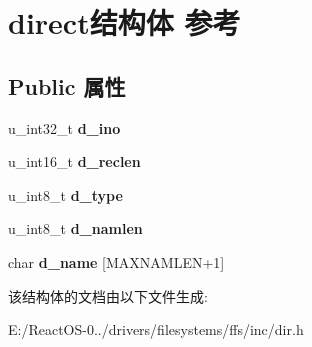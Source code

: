 \hypertarget{structdirect}{}\section{direct结构体 参考}
\label{structdirect}
\subsection*{Public 属性}
\begin{DoxyCompactItemize}
\item 
\mbox{\label{structdirect_a495867044edecae84eb46e0803b1a64b}} 
u\+\_\+int32\+\_\+t {\bfseries d\+\_\+ino}
\item 
\mbox{\label{structdirect_aaacac319fc3a8ba5627d29c12b36965a}} 
u\+\_\+int16\+\_\+t {\bfseries d\+\_\+reclen}
\item 
\mbox{\label{structdirect_a63c7db12b0e4ec0ffe19292fa590e81b}} 
u\+\_\+int8\+\_\+t {\bfseries d\+\_\+type}
\item 
\mbox{\label{structdirect_a7d55d352a3b6d10c98988f7f0153db63}} 
u\+\_\+int8\+\_\+t {\bfseries d\+\_\+namlen}
\item 
\mbox{\label{structdirect_a5c53c32577db74ad12b5fa6fbf41976c}} 
char {\bfseries d\+\_\+name} \mbox{[}M\+A\+X\+N\+A\+M\+L\+EN+1\mbox{]}
\end{DoxyCompactItemize}


该结构体的文档由以下文件生成\+:\begin{DoxyCompactItemize}
\item 
E\+:/\+React\+O\+S-\/0../drivers/filesystems/ffs/inc/dir.\+h\end{DoxyCompactItemize}
